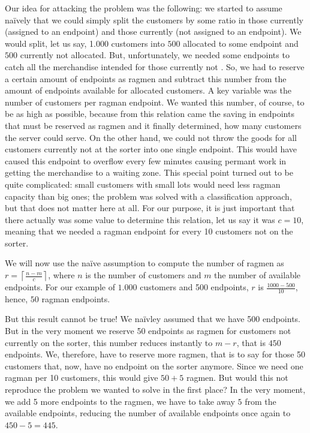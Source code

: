 \documentclass{scrreprt}
\begin{document}
Our idea for attacking the problem was the following:
we started to assume na\"ively that we could
simply split the customers by some ratio 
in those currently  (assigned to an endpoint) and
those currently  (not assigned to an endpoint).
We would split, let us say, \num{1,000} customers 
into $500$ allocated to some endpoint
and $500$ currently not allocated.
But, unfortunately, we needed some endpoints
to catch all the merchandise intended
for those currently not .
So, we had to reserve a certain amount
of endpoints as ragmen
and subtract this number from the amount
of endpoints available for allocated customers.
A key variable was the number of customers 
per ragman endpoint.
We wanted this number, of course, to be as high
as possible, because from this relation 
came the saving in endpoints that must be reserved
as ragmen and it finally determined,
how many customers the server could serve.
On the other hand, we could not throw the goods
for all customers currently not at the sorter
into one single endpoint. This would have caused
this endpoint to overflow every few minutes
causing permant work in getting the merchandise
to a waiting zone.
This special point turned out to be quite complicated:
small customers with small lots would need
less ragman capacity than big ones; 
the problem was solved with
a classification approach,
but that does not matter here at all.
For our purpose, it is just important
that there actually was some value
to determine this relation, let us say
it was $c = 10$, meaning that we needed
a ragman endpoint for every 10 customers
not on the sorter.

We will now use the na\"ive assumption
to compute the number of ragmen 
as $r = \left\lceil\frac{n-m}{c}\right\rceil$,
where $n$ is the number of customers
and $m$ the number of available endpoints.
For our example 
of $\num{1,000}$ customers and 500 endpoints,
$r$ is $\frac{1000 - 500}{10}$,
hence, $50$ ragman endpoints.

But this result cannot be true!
We na\"ivley assumed that we have 500 endpoints.
But in the very moment
we reserve 50 endpoints as ragmen
for customers not currently on the sorter,
this number reduces instantly to $m - r$,
that is $450$ endpoints.
We, therefore, have to reserve more ragmen,
that is to say for those 50 customers that, now,
have no endpoint on the sorter anymore.
Since we need one ragman per 10 customers,
this would give $50 + 5$ ragmen.
But would this not reproduce the problem
we wanted to solve in the first place?
In the very moment, we add 5 more endpoints
to the ragmen, we have to take away $5$
from the available endpoints,
reducing the number of available endpoints once again
to $450-5 = 445$.
\end{document}
